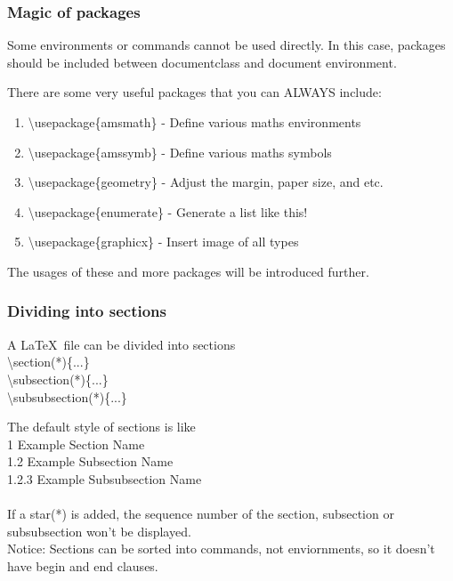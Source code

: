 \documentclass{beamer}
\begin{document}
\begin{frame}
	\frametitle{Magic of packages}
	\begin{definition}
		Some environments or commands cannot be used directly. In this case,  {\color{blue}packages} should be included between {\color{blue}documentclass} and {\color{blue}document environment}.
	\end{definition}
	There are some very useful packages that you can {\color{blue}ALWAYS} include:
	\begin{enumerate}
		\item {\color{red}\textbackslash usepackage\{amsmath\}} - Define various maths environments
		\item {\color{red}\textbackslash usepackage\{amssymb\}} - Define various maths symbols
		\item {\color{red}\textbackslash usepackage\{geometry\}} - Adjust the margin, paper size, and etc.
		\item {\color{red}\textbackslash usepackage\{enumerate\}} - Generate a list like this!
		\item {\color{red}\textbackslash usepackage\{graphicx\}} - Insert image of all types
	\end{enumerate}
	The usages of these and more packages will be introduced further.
\end{frame}

\begin{frame}
	\frametitle{Dividing into sections}
	\begin{definition}
		A \LaTeX\ file can be divided into sections\\
		{\color{red}\textbackslash section(*)\{...\}}\\
		{\color{red}\textbackslash subsection(*)\{...\}}\\
		{\color{red}\textbackslash subsubsection(*)\{...\}}\\
	\end{definition}
	The default style of sections is like\\
	{\color{blue}1 Example Section Name}\\
	{\color{blue}1.2 Example Subsection Name}\\
	{\color{blue}1.2.3 Example Subsubsection Name}\\
	\ \\
	If a star({\color{blue}*}) is added, the sequence number of the section, subsection or subsubsection won't be displayed.\\
	{\color{blue}Notice:} Sections can be sorted into commands, not enviornments, so it doesn't have {\color{blue}begin} and {\color{blue}end} clauses.
\end{frame}
\end{document}

